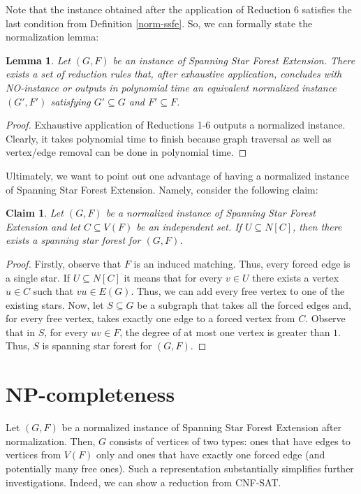 \documentclass[en]{pracamgr}
\newtheorem{lemma}{Lemma}
\newtheorem{claim}{Claim}
\newcommand{\ssfep}{{\sc Spanning Star Forest Extension}}
\newcommand{\cnfsat}{{\sc CNF-SAT}}
\begin{document}
Note that the instance obtained after the application of Reduction 6 satisfies the last condition from Definition \ref{norm-ssfe}. So, we can formally state the normalization lemma:

\begin{lemma}
	Let $(G,F)$ be an instance of \ssfep{}. There exists a set of reduction rules that, after exhaustive application, concludes with NO-instance or outputs in polynomial time an equivalent normalized instance $(G',F')$ satisfying $G' \subseteq G$ and $F' \subseteq F$.
\end{lemma}

\begin{proof}
	Exhaustive application of Reductions 1-6 outputs a normalized instance. Clearly, it takes polynomial time to finish because graph traversal as well as vertex/edge removal can be done in polynomial time.
\end{proof}

Ultimately, we want to point out one advantage of having a normalized instance of \ssfep{}. Namely, consider the following claim:

\begin{claim}\label{span-lemma}
	Let $(G,F)$ be a normalized instance of \ssfep{} and let $C \subseteq V(F)$ be an independent set. If $U \subseteq N[C]$, then there exists a spanning star forest for $(G,F)$.
\end{claim}

\begin{proof}
	Firstly, observe that $F$ is an induced matching. Thus, every forced edge is a single star. If $U \subseteq N[C]$ it means that for every $v \in U$ there exists a vertex $u \in C$ such that $vu \in E(G)$. Thus, we can add every free vertex to one of the existing stars. Now, let $S \subseteq G$ be a subgraph that takes all the forced edges and, for every free vertex, takes exactly one edge to a forced vertex from $C$. Observe that in $S$, for every $uv \in F$, the degree of at most one vertex is greater than $1$. Thus, $S$ is spanning star forest for $(G,F)$.
\end{proof}



\section{NP-completeness}

Let $(G,F)$ be a normalized instance of \ssfep{} after normalization. Then, $G$ consists of vertices of two types: ones that have edges to vertices from $V(F)$ only and ones that have exactly one forced edge (and potentially many free ones). Such a representation substantially simplifies further investigations. Indeed, we can show a reduction from \cnfsat{}.
\end{document}
